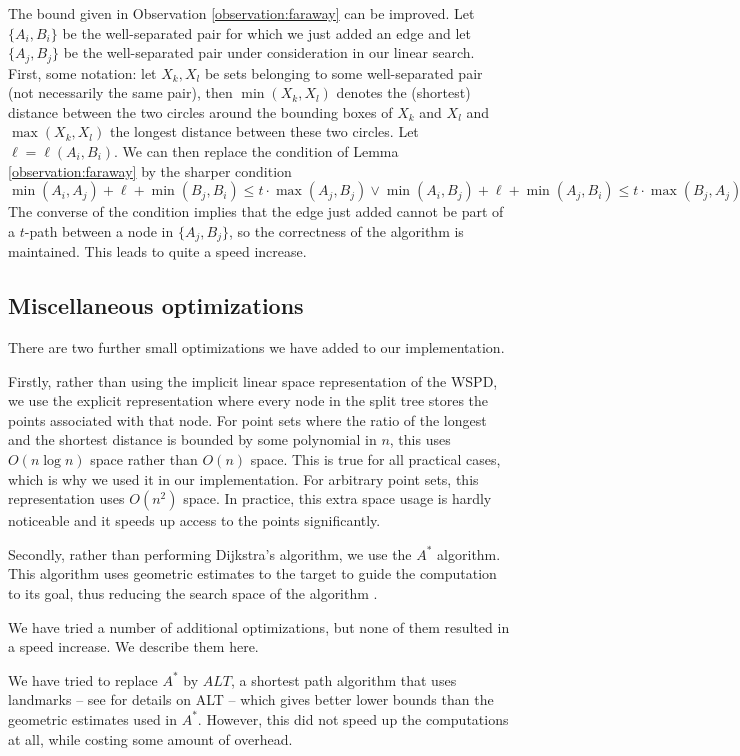 \documentclass[runningheads,envcountsame,oribibl,orivec]{llncs}
\begin{document}
The bound given in Observation \ref{observation:faraway} can be improved. Let $\{ A_i, B_i \}$ be the well-separated pair for which we just added an edge and let $\{ A_j, B_j \}$ be the well-separated pair under consideration in our linear search. First, some notation: let $X_k, X_l$ be sets belonging to some well-separated pair (not necessarily the same pair), then $\min(X_k, X_l)$ denotes the (shortest) distance between the two circles around the bounding boxes of $X_k$ and $X_l$ and $\max(X_k, X_l)$ the longest distance between these two circles. Let $\ell = \ell(A_i, B_i)$. We can then replace the condition of Lemma \ref{observation:faraway} by the sharper condition $\min(A_i, A_j) + \ell + \min(B_j, B_i) \leq t \cdot \max(A_j, B_j) \vee \min(A_i, B_j) + \ell + \min(A_j, B_i) \leq t \cdot \max(B_j, A_j)$ The converse of the condition implies that the edge just added cannot be part of a $t$-path between a node in $\{ A_j, B_j \}$, so the correctness of the algorithm is maintained. This leads to quite a speed increase.

\subsection{Miscellaneous optimizations}

There are two further small optimizations we have added to our implementation.

Firstly, rather than using the implicit linear space representation of the WSPD, we use the explicit representation where every node in the split tree stores the points associated with that node. For point sets where the ratio of the longest and the shortest distance is bounded by some polynomial in $n$, this uses $O(n \log n)$ space rather than $O(n)$ space. This is true for all practical cases, which is why we used it in our implementation. For arbitrary point sets, this representation uses $O(n^2)$ space. In practice, this extra space usage is hardly noticeable and it speeds up access to the points significantly.

Secondly, rather than performing Dijkstra's algorithm, we use the $A^*$ algorithm. This algorithm uses geometric estimates to the target to guide the computation to its goal, thus reducing the search space of the algorithm \cite{Goldberg:2005:CSP:1070432.1070455}.

We have tried a number of additional optimizations, but none of them resulted in a speed increase. We describe them here.

We have tried to replace $A^*$ by $ALT$, a shortest path algorithm that uses landmarks -- see \cite{Goldberg:2005:CSP:1070432.1070455} for details on ALT -- which gives better lower bounds than the geometric estimates used in $A^*$. However, this did not speed up the computations at all, while costing some amount of overhead.
\end{document}

